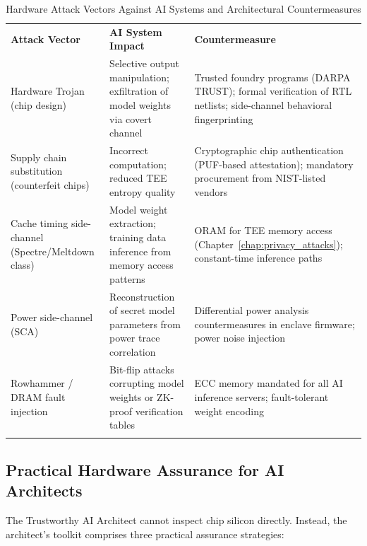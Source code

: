 \begin{table}[ht]
\centering
\caption{Hardware Attack Vectors Against AI Systems and Architectural Countermeasures}
\label{tab:hardware_attacks}
\begin{tabular}{p{3.0cm} p{4.0cm} p{5.0cm}}
\hline\noalign{\smallskip}
\textbf{Attack Vector} & \textbf{AI System Impact} & \textbf{Countermeasure} \\
\noalign{\smallskip}\svhline\noalign{\smallskip}
Hardware Trojan (chip design) & Selective output manipulation; exfiltration of model weights via covert channel & Trusted foundry programs (DARPA TRUST); formal verification of RTL netlists; side-channel behavioral fingerprinting \\[4pt]
Supply chain substitution (counterfeit chips) & Incorrect computation; reduced TEE entropy quality & Cryptographic chip authentication (PUF-based attestation); mandatory procurement from NIST-listed vendors \\[4pt]
Cache timing side-channel (Spectre/Meltdown class) & Model weight extraction; training data inference from memory access patterns & ORAM for TEE memory access (Chapter~\ref{chap:privacy_attacks}); constant-time inference paths \\[4pt]
Power side-channel (SCA) & Reconstruction of secret model parameters from power trace correlation & Differential power analysis countermeasures in enclave firmware; power noise injection \\[4pt]
Rowhammer / DRAM fault injection & Bit-flip attacks corrupting model weights or ZK-proof verification tables & ECC memory mandated for all AI inference servers; fault-tolerant weight encoding \\
\noalign{\smallskip}\hline\noalign{\smallskip}
\end{tabular}
\end{table}

\subsection{Practical Hardware Assurance for AI Architects}
\label{subsec:hardware_assurance}

The Trustworthy AI Architect cannot inspect chip silicon directly. Instead, the architect's toolkit comprises three practical assurance strategies:

